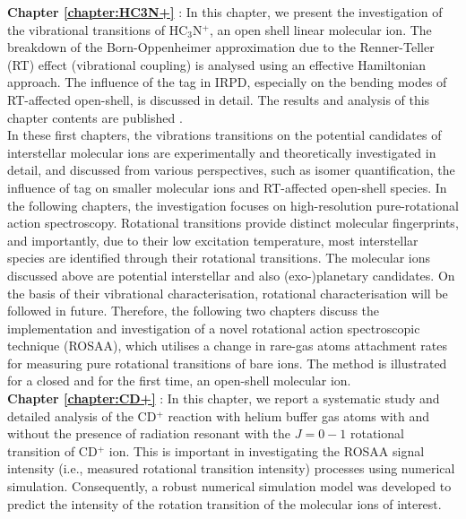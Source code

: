 \textbf{Chapter \ref{chapter:HC3N+}} \emph{}: In this chapter, we present the investigation of the vibrational transitions of HC$_3$N$^+$, an open shell linear molecular ion. The breakdown of the Born-Oppenheimer approximation due to the Renner-Teller (RT) effect (vibrational coupling) is analysed using an effective Hamiltonian approach. The influence of the tag in IRPD, especially on the bending modes of RT-affected open-shell, is discussed in detail. The results and analysis of this chapter contents are published \cite{steenbakkers_vibrational_2023}.\\

In these first chapters, the vibrations transitions on the potential candidates of interstellar molecular ions are experimentally and theoretically investigated in detail, and discussed from various perspectives, such as isomer quantification, the influence of tag on smaller molecular ions and RT-affected open-shell species. In the following chapters, the investigation focuses on high-resolution pure-rotational action spectroscopy. Rotational transitions provide distinct molecular fingerprints, and importantly, due to their low excitation temperature, most interstellar species are identified through their rotational transitions. The molecular ions discussed above are potential interstellar and also (exo-)planetary candidates. On the basis of their vibrational characterisation, rotational characterisation will be followed in future. Therefore, the following two chapters discuss the implementation and investigation of a novel rotational action spectroscopic technique (ROSAA), which utilises a change in rare-gas atoms attachment rates for measuring pure rotational transitions of bare ions. The method is illustrated for a closed and for the first time, an open-shell molecular ion. \\

\textbf{Chapter \ref{chapter:CD+}} \emph{}: In this chapter, we report a systematic study and detailed analysis of the CD$^+$ reaction with helium buffer gas atoms with and without the presence of radiation resonant with the $J=0-1$ rotational transition of CD$^+$ ion. This is important in investigating the ROSAA signal intensity (i.e., measured rotational transition intensity) processes using numerical simulation. Consequently, a robust numerical simulation model was developed to predict the intensity of the rotation transition of the molecular ions of interest.

